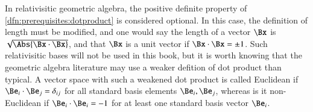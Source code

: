 In relativisitic geometric algebra, the positive definite property of \cref{dfn:prerequisites:dotproduct} is considered optional.
In this case, the definition of length must be modified, and one would say the length of a vector \( \Bx \) is \( \sqrt{\Abs{\Bx \cdot \Bx}} \), and that \( \Bx \) is a unit vector if \( \Bx \cdot \Bx = \pm 1 \).
Such relativisitic bases will not be used in this book, but it is worth knowing that the geometric algebra literature may use a weaker defition of dot product than typical.
A vector space
with such a weakened dot product is called Euclidean if \( \Be_i \cdot \Be_j = \delta_{ij} \) for all standard basis elements \( \Be_i, \Be_j \), whereas is it non-Euclidean if \( \Be_i \cdot \Be_i = -1 \) for at least one standard basis vector \( \Be_i \).
